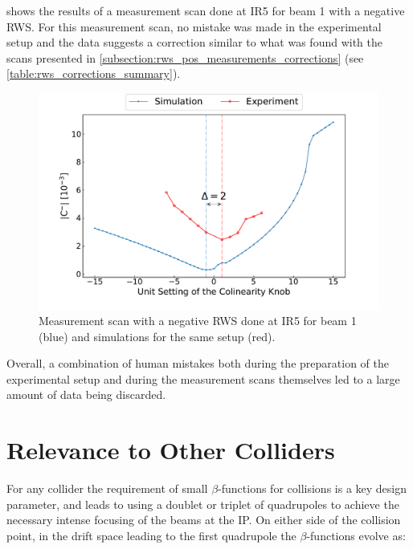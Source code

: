  shows the results of a measurement scan done at IR\num{5} for beam \num{1} with a negative RWS.
For this measurement scan, no mistake was made in the experimental setup and the data suggests a correction similar to what was found with the scans presented in \cref{subsection:rws_pos_measurements_corrections} (see \cref{table:rws_corrections_summary}).

\begin{figure}[!htb]
    \centering
    \includegraphics*[width=\textwidth]{Figures/IR_Coupling_Correction/rws_measurement_ir5_b2_neg.pdf}
    \caption{Measurement scan with a negative RWS done at IR\num{5} for beam \num{1} (\textcolor{mplblue}{blue}) and simulations for the same setup (\textcolor{mplr}{red}).}
    \label{figure:ir5_b2_neg_measurement}
\end{figure}

Overall, a combination of human mistakes both during the preparation of the experimental setup and during the measurement scans themselves led to a large amount of data being discarded.

\section{Relevance to Other Colliders}

For any collider the requirement of small \(\beta\)-functions for collisions is a key design parameter, and leads to using a doublet or triplet of quadrupoles to achieve the necessary intense focusing of the beams at the IP.
On either side of the collision point, in the drift space leading to the first quadrupole the \(\beta\)-functions evolve as:


